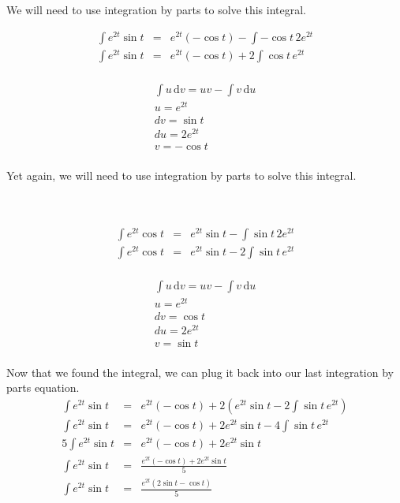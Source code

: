 \documentclass[11pt]{exam}
\begin{document}
We will need to use integration by parts to solve this integral.\\
\noindent
\begin{minipage}{.5\linewidth}
	\begin{eqnarray*}
 		\int e^{2t} \sin t &=& e^{2t}(-\cos t) - \int -\cos t \, 2e^{2t} \\
 		\int e^{2t} \sin t &=& e^{2t}(-\cos t) +2 \int \cos t \, e^{2t} \\
	\end{eqnarray*}
\end{minipage}
\begin{minipage}{.5\linewidth}
	\begin{eqnarray*}
	  	\int u \, \mathrm{d}v = uv - \int v \, \mathrm{d}u\\
	  	u = e^{2t} \\
	  	dv = \sin t \\
	  	du = 2e^{2t} \\
	  	v = -\cos t \\
	\end{eqnarray*}
\end{minipage}
Yet again, we will need to use integration by parts to solve this integral.\\\\
\\
\noindent
\begin{minipage}{.5\linewidth}
	\begin{eqnarray*}
 		\int e^{2t} \cos t &=& e^{2t}\sin t - \int \sin t \, 2e^{2t} \\
 		\int e^{2t} \cos t &=& e^{2t}\sin t - 2\int \sin t \, e^{2t} \\
	\end{eqnarray*}
\end{minipage}
\begin{minipage}{.5\linewidth}
	\begin{eqnarray*}
	  	\int u \, \mathrm{d}v = uv - \int v \, \mathrm{d}u\\
	  	u = e^{2t} \\
	  	dv = \cos t \\
	  	du = 2e^{2t} \\
	  	v = \sin t \\
	\end{eqnarray*}
\end{minipage}
Now that we found the integral, we can plug it back into our last integration by parts equation. 
\begin{eqnarray*}
	\int e^{2t} \sin t &=& e^{2t}(-\cos t) +2(e^{2t}\sin t - 2\int \sin t \, e^{2t}) \\
	\int e^{2t} \sin t &=& e^{2t}(-\cos t) +2e^{2t}\sin t - 4\int \sin t \, e^{2t} \\
	5\int e^{2t} \sin t &=& e^{2t}(-\cos t) +2e^{2t}\sin t \\
	\int e^{2t} \sin t &=& \frac{e^{2t}(-\cos t) +2e^{2t}\sin t}{5} \\
	\int e^{2t} \sin t &=& \frac{e^{2t}(2\sin t-\cos t)}{5} \\
\end{eqnarray*}
\end{document}
